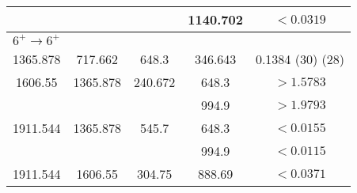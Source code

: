 \begin{portrait}
\begin{longtable}{c|c|c|c|c}
        &  &  & 1140.702 & $<0.0319$   \\ \hline
        \multicolumn{5}{l}{$6^+\rightarrow 6^+$} 	\\ \hline
        1365.878 & 717.662 & 648.3 & 346.643 & 0.1384 (30) (28) \\ \hline
        1606.55 & 1365.878 & 240.672 & 648.3 &  $>1.5783$ \\
        &  &  & 994.9 &  $>1.9793$   \\ \hline
        1911.544 & 1365.878 & 545.7 & 648.3 &  $<0.0155$ \\
        &  &  & 994.9 &  $<0.0115$   \\ \hline
        1911.544 & 1606.55 & 304.75 & 888.69 & $<0.0371$  \\
        \bottomrule
	\end{longtable}
\end{portrait}